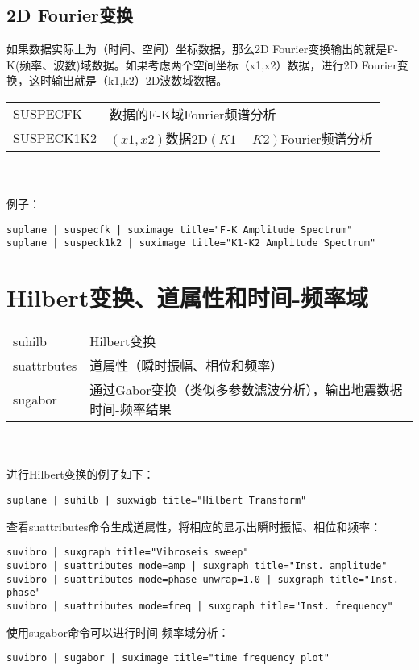 \subsection{2D Fourier变换}
如果数据实际上为（时间、空间）坐标数据，那么2D Fourier变换输出的就是F-K(频率、波数)域数据。如果考虑两个空间坐标（x1,x2）数据，进行2D Fourier变换，这时输出就是（k1,k2）2D波数域数据。\par\mvspace
\begin{tabular}{ll}
	\toprule
	SUSPECFK & 数据的F-K域Fourier频谱分析\\
	SUSPECK1K2 &  $(x1,x2)$数据2D$(K1-K2)$Fourier频谱分析\\
	\bottomrule
\end{tabular}\\\\
例子：
\begin{lstlisting}
suplane | suspecfk | suximage title="F-K Amplitude Spectrum" 
suplane | suspeck1k2 | suximage title="K1-K2 Amplitude Spectrum" 
\end{lstlisting}

\section{Hilbert变换、道属性和时间-频率域}
\begin{tabular}{lp{}}
	\toprule
	suhilb & Hilbert变换\\
	suattrbutes & 道属性（瞬时振幅、相位和频率）\\
	sugabor & 通过Gabor变换（类似多参数滤波分析），输出地震数据时间-频率结果\\
	\bottomrule
\end{tabular}\\\\
进行Hilbert变换的例子如下：
\begin{lstlisting}
suplane | suhilb | suxwigb title="Hilbert Transform"
\end{lstlisting}
查看suattributes命令生成道属性，将相应的显示出瞬时振幅、相位和频率：
\begin{lstlisting}
suvibro | suxgraph title="Vibroseis sweep" 
suvibro | suattributes mode=amp | suxgraph title="Inst. amplitude" 
suvibro | suattributes mode=phase unwrap=1.0 | suxgraph title="Inst. phase" 
suvibro | suattributes mode=freq | suxgraph title="Inst. frequency" 
\end{lstlisting}
使用sugabor命令可以进行时间-频率域分析：
\begin{lstlisting}
suvibro | sugabor | suximage title="time frequency plot" 
\end{lstlisting}

